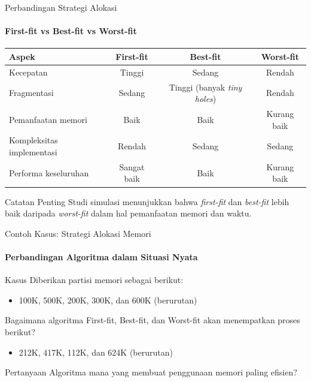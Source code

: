 \documentclass[10pt,aspectratio=169]{beamer}
\begin{document}
\begin{frame}{Perbandingan Strategi Alokasi}
    \framesubtitle{First-fit vs Best-fit vs Worst-fit}
    
    \begin{center}
        \begin{tabular}{|l|c|c|c|}
            \hline
            \textbf{Aspek} & \textbf{First-fit} & \textbf{Best-fit} & \textbf{Worst-fit} \\
            \hline
            Kecepatan & Tinggi & Sedang & Rendah \\
            \hline
            Fragmentasi & Sedang & Tinggi (banyak \textit{tiny holes}) & Rendah \\
            \hline
            Pemanfaatan memori & Baik & Baik & Kurang baik \\
            \hline
            Kompleksitas implementasi & Rendah & Sedang & Sedang \\
            \hline
            Performa keseluruhan & Sangat baik & Baik & Kurang baik \\
            \hline
        \end{tabular}
    \end{center}
    
    \begin{alertblock}{Catatan Penting}
        Studi simulasi menunjukkan bahwa \textit{first-fit} dan \textit{best-fit} lebih baik daripada \textit{worst-fit} dalam hal pemanfaatan memori dan waktu.
    \end{alertblock}
\end{frame}

\begin{frame}{Contoh Kasus: Strategi Alokasi Memori}
    \framesubtitle{Perbandingan Algoritma dalam Situasi Nyata}
    
    \begin{block}{Kasus}
        Diberikan partisi memori sebagai berikut:
        \begin{itemize}
            \item 100K, 500K, 200K, 300K, dan 600K (berurutan)
        \end{itemize}
        
        Bagaimana algoritma First-fit, Best-fit, dan Worst-fit akan menempatkan proses berikut?
        \begin{itemize}
            \item 212K, 417K, 112K, dan 624K (berurutan)
        \end{itemize}
    \end{block}
    
    \begin{alertblock}{Pertanyaan}
        Algoritma mana yang membuat penggunaan memori paling efisien?
    \end{alertblock}
\end{frame}
\end{document}
